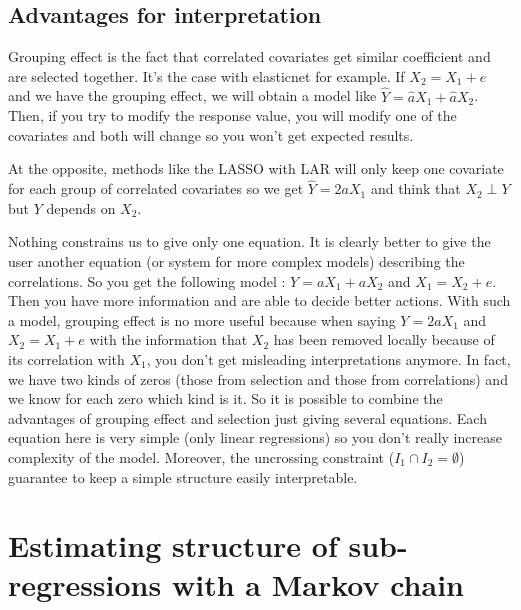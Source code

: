 \documentclass[11pt,a4paper]{article}
\begin{document}
	\subsection{Advantages for interpretation}
	
		Grouping effect is the fact that correlated covariates get similar coefficient and are selected together. It's the case with elasticnet \cite{zou2005regularization} for example.	
			If $X_2=X_1+e$ and we have the grouping effect, we will obtain a model like $\hat{Y}=\hat{a}X_1+\hat{a}X_2$. 
			Then, if you try to modify the response value, you will modify one of the covariates and both will change so you won't get expected results. 
			
		At the opposite, methods like the LASSO with LAR will only keep one covariate for each group of correlated covariates  so we get $\hat{Y}=2aX_1$ and think that $X_2 \perp Y$ but $Y$ depends on $X_2$.
		
		
			Nothing constrains us to give only one equation. It is clearly better to give the user another equation (or system for more complex models) describing the correlations. 
			So you get the following model : $Y=aX_1+aX_2$ and $X_1=X_2+e$. Then you have more information and are able to decide better actions. 
			With such a model, grouping effect is no more useful because when saying $Y=2aX_1$ and $X_2=X_1+e$ with the information that $X_2$ has been removed locally because of its correlation with $X_1$, you don't get misleading interpretations anymore. In fact, we have two kinds of zeros (those from selection and those from correlations) and we know for each zero which kind is it.
			So it is possible to combine the advantages of grouping effect and selection just giving several equations. 
			Each equation here is very simple (only linear regressions) so you don't really increase complexity of the model. 
			Moreover, the uncrossing constraint ($I_1\cap I_2=\emptyset$) guarantee to keep a simple structure easily interpretable.

	
	\section{Estimating structure of sub-regressions with a Markov chain}	
\end{document}

